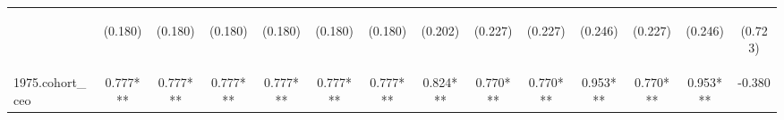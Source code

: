 \begin{center}
\begin{tabular}{lccccccccccccc}
\vspace{4pt} & \begin{footnotesize}(0.180)\end{footnotesize} & \begin{footnotesize}(0.180)\end{footnotesize} & \begin{footnotesize}(0.180)\end{footnotesize} & \begin{footnotesize}(0.180)\end{footnotesize} & \begin{footnotesize}(0.180)\end{footnotesize} & \begin{footnotesize}(0.180)\end{footnotesize} & \begin{footnotesize}(0.202)\end{footnotesize} & \begin{footnotesize}(0.227)\end{footnotesize} & \begin{footnotesize}(0.227)\end{footnotesize} & \begin{footnotesize}(0.246)\end{footnotesize} & \begin{footnotesize}(0.227)\end{footnotesize} & \begin{footnotesize}(0.246)\end{footnotesize} & \begin{footnotesize}(0.723)\end{footnotesize} \\
1975.cohort\_ceo & 0.777*** & 0.777*** & 0.777*** & 0.777*** & 0.777*** & 0.777*** & 0.824*** & 0.770*** & 0.770*** & 0.953*** & 0.770*** & 0.953*** & -0.380 \\

\end{tabular}
\end{center}
